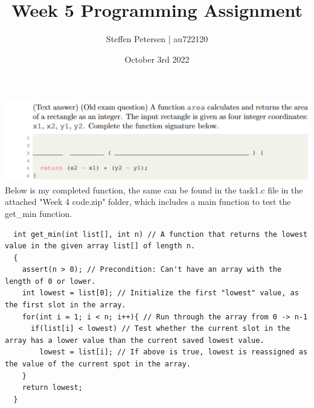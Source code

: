 \documentclass{article}
\title{Week 5 Programming Assignment}
\author{Steffen Petersen | au722120}
\date{October 3rd 2022}
\begin{document}


\maketitle
\section{}
\includegraphics[width=\linewidth, keepaspectratio=true]{task1}
\vspace{2pt}\\
Below is my completed function, the same can be found in the task1.c file in the attached "Week 4 code.zip" folder, which includes a main function to test the get\_min function.
\begin{lstlisting}
  int get_min(int list[], int n) // A function that returns the lowest value in the given array list[] of length n.
  {
    assert(n > 0); // Precondition: Can't have an array with the length of 0 or lower.
    int lowest = list[0]; // Initialize the first "lowest" value, as the first slot in the array.
    for(int i = 1; i < n; i++){ // Run through the array from 0 -> n-1
      if(list[i] < lowest) // Test whether the current slot in the array has a lower value than the current saved lowest value.
        lowest = list[i]; // If above is true, lowest is reassigned as the value of the current spot in the array.
    }
    return lowest;
  } 
\end{lstlisting}
\end{document}
